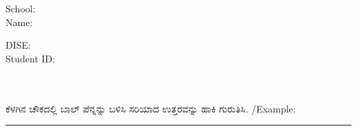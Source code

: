 \documentclass[12pt,
  english,
  oneside,
  pagemark,
  stamp,headheight=0cm]{sdaps}
\title{\-\vspace{1ex}\Large \textbf {\phantom {State Assessment Survey}}}
\begin{document}
\setlength{\checkboxsize}{3.5mm}
\begin{questionnaire}[noinfo]
  \vspace{-2ex}
  \hspace{1ex}
  \begin{minipage}{0.5\textwidth}
    School: \\[2ex]
    Name:
  \end{minipage}
  \begin{minipage}{0.3\textwidth}
    DISE:\\[2ex]
    Student ID:\\
  \end{minipage}\\[1ex]
  \hfill\\{\kannada ಕೆಳಗಿನ ಚೌಕದಲ್ಲಿ ಬಾಲ್ ಪೆನ್ನನ್ನು ಬಳಿಸಿ ಸರಿಯಾದ ಉತ್ತರವನ್ನು}{\large \checkmark} {\kannada ಹಾಕಿ ಗುರುತಿಸಿ.}
  /Example:\enspace\makebox[0pt][l]{$\square$}\raisebox{.15ex}{\hspace{0.1em}$\checkmark$}\\\hrule
  \begin{minipage}{0.47\textwidth}
    \begin{minipage}{1.0\textwidth}
      \begin{choicegroup}{}
      \end{choicegroup}
    \end{minipage}\\[1ex]
    \begin{minipage}{0.975\textwidth}
      \begin{choicegroup}{}
      \end{choicegroup}
    \end{minipage}
  \end{minipage}
  \begin{minipage}{0.5\textwidth}
    \begin{minipage}{0.75\textwidth}
      \begin{choicegroup}{}
      \end{choicegroup}
    \end{minipage}\\[1ex]
    \begin{minipage}{1.0\textwidth}

\end{minipage}
\end{minipage}
\end{questionnaire}
\end{document}
